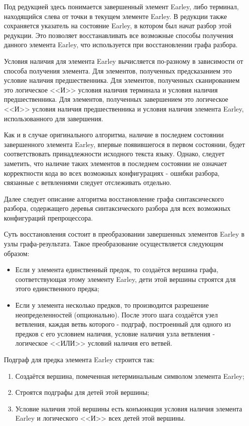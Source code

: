 Под редукцией здесь понимается завершенный элемент Earley, либо терминал, находящийся слева от точки в текущем элементе Earley. В редукции также сохраняется указатель на состояние Earley, в котором был начат разбор этой редукции. Это позволяет восстанавливать все возможные способы получения данного элемента Earley, что используется при восстановлении графа разбора.

Условия наличия для элемента Earley вычисляется по-разному в зависимости от способа получения элемента. Для элементов, полученных предсказанием это условие наличия предшественника. Для элементов, полученных сканированием это логическое <<И>> условия наличия терминала и условия наличия предшественника. Для элементов, полученных завершением это логическое <<И>> условия наличия предшественника и условия наличия элемента Earley, использованного для завершения.

Как и в случае оригинального алгоритма, наличие в последнем состоянии завершенного элемента Earley, впервые появившегося в первом состоянии, будет соответствовать принадлежности исходного текста языку. Однако, следует заметить, что наличие таких элементов в последнем состоянии не означает корректности кода во всех возможных конфигурациях - ошибки разбора, связанные с ветвлениями следует отслеживать отдельно.

Далее следует описание алгоритма восстановление графа синтаксического разбора, содержащего деревья синтаксического разбора для всех возможных конфигураций препроцессора.

Суть восстановления состоит в преобразовании завершенных элементов Earley в узлы графа-результата. Такое преобразование осуществляется следующим образом:

\begin{itemize}
\item Если у элемента единственный предок, то создаётся вершина графа, соответствующая этому элементу Earley, дети этой вершины строятся для этого единственного предка;
\item Если у элемента несколько предков, то производится разрешение неопределенностей (опционально). После этого шага создаётся узел ветвления, каждая ветвь которого - подграф, построенный для одного из предков с его условием наличия, условие наличия узла ветвления - логическое <<ИЛИ>> условий наличия его ветвей.
\end{itemize}

Подграф для предка элемента Earley строится так:

\begin{enumerate}
\item Создаётся вершина, помеченная нетерминальным символом элемента Earley;
\item Строятся подграфы для детей этой вершины;
\item Условие наличия этой вершины есть конъюнкция условия наличия элемента Earley и логического <<И>> всех детей этой вершины.
\end{enumerate}

